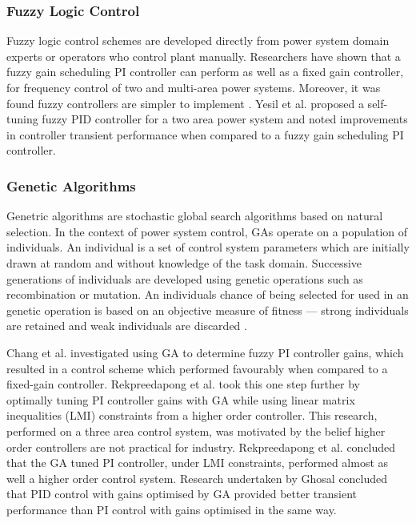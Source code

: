 \subsubsection{Fuzzy Logic Control}
Fuzzy logic control schemes are developed directly from power system domain experts or operators who control plant manually. Researchers have shown that a fuzzy gain scheduling PI controller can perform as well as a fixed gain controller, for frequency control of two and multi-area power systems. Moreover, it was found fuzzy controllers are simpler to implement \cite{Chang1997, Cam2005}. Yesil et al. \cite{Yesil2004} proposed a self-tuning fuzzy PID controller for a two area power system and noted improvements in controller transient performance when compared to a fuzzy gain scheduling PI controller.

\subsubsection{Genetic Algorithms}
Genetric algorithms are stochastic global search algorithms based on natural selection. In the context of power system control, GAs operate on a population of individuals. An individual is a set of control system parameters which are initially drawn at random and without knowledge of the task domain. Successive generations of individuals are developed using genetic operations such as recombination or mutation. An individuals chance of being selected for used in an genetic operation is based on an objective measure of fitness --- strong individuals are retained and weak individuals are discarded \cite{Fleming1993}.

Chang et al. \cite{Chang1998} investigated using GA to determine fuzzy PI controller gains, which resulted in a control scheme which performed favourably when compared to a fixed-gain controller. Rekpreedapong et al. \cite{Rerkpreedapong2003} took this one step further by optimally tuning PI controller gains with GA while using linear matrix inequalities (LMI) constraints from a higher order controller. This research, performed on a three area control system, was motivated by the belief higher order controllers are not practical for industry. Rekpreedapong et al. concluded that the GA tuned PI controller, under LMI constraints, performed almost as well a higher order control system. Research undertaken by Ghosal \cite{Ghoshal2004} concluded that PID control with gains optimised by GA provided better transient performance than PI control with gains optimised in the same way.

